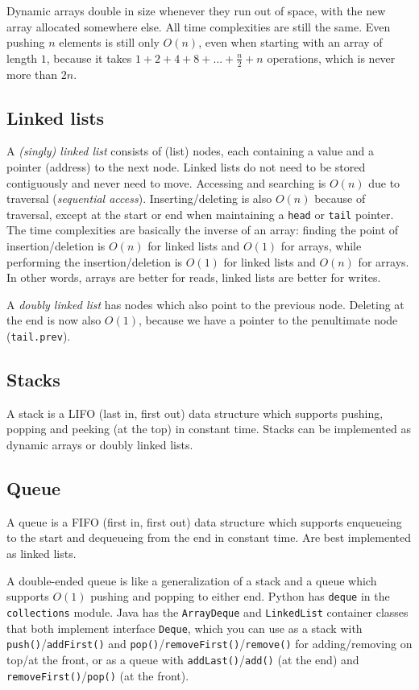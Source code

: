 \documentclass[8pt, table, xcdraw]{article}%
\begin{document}
Dynamic arrays double in size whenever they run out of space, with the new array allocated somewhere else. All time complexities are still the same. Even pushing $n$ elements is still only $O(n)$, even when starting with an array of length $1$, because it takes $1 + 2 + 4 + 8 + ... + \frac{n}{2} + n$ operations, which is never more than $2n$.

\subsection{Linked lists}

A \emph{(singly) linked list} consists of (list) nodes, each containing a value and a pointer (address) to the next node. Linked lists do not need to be stored contiguously and never need to move. Accessing and searching is $O(n)$ due to traversal (\emph{sequential access}). Inserting/deleting is also $O(n)$ because of traversal, except at the start or end when maintaining a \lstinline{head} or \lstinline{tail} pointer. The time complexities are basically the inverse of an array: finding the point of insertion/deletion is $O(n)$ for linked lists and $O(1)$ for arrays, while performing the insertion/deletion is $O(1)$ for linked lists and $O(n)$ for arrays. In other words, arrays are better for reads, linked lists are better for writes.

A \emph{doubly linked list} has nodes which also point to the previous node. Deleting at the end is now also $O(1)$, because we have a pointer to the penultimate node (\lstinline{tail.prev}).

\subsection{Stacks}

A stack is a LIFO (last in, first out) data structure which supports pushing, popping and peeking (at the top) in constant time. Stacks can be implemented as dynamic arrays or doubly linked lists.

\subsection{Queue}

A queue is a FIFO (first in, first out) data structure which supports enqueueing to the start and dequeueing from the end in constant time. Are best implemented as linked lists.

A double-ended queue is like a generalization of a stack and a queue which supports $O(1)$ pushing and popping to either end. Python has \lstinline{deque} in the \lstinline{collections} module. Java has the \lstinline{ArrayDeque} and \lstinline{LinkedList} container classes that both implement interface \lstinline{Deque}, which you can use as a stack with \lstinline{push()}/\lstinline{addFirst()} and \lstinline{pop()}/\lstinline{removeFirst()}/\lstinline{remove()} for adding/removing on top/at the front, or as a queue with \lstinline{addLast()}/\lstinline{add()} (at the end) and \lstinline{removeFirst()}/\lstinline{pop()} (at the front).
\end{document}
